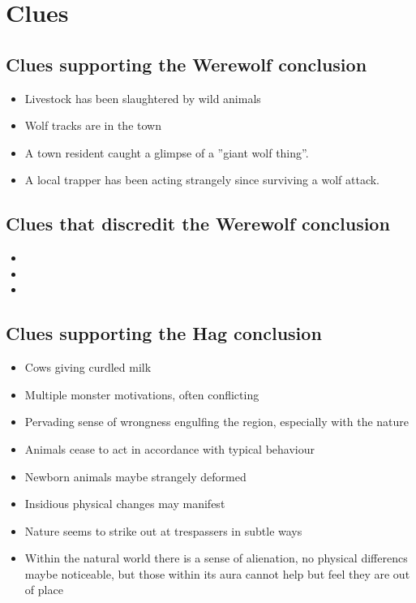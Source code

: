 \chapter{Clues}

\section{Clues supporting the Werewolf conclusion}

\begin{itemize}
    \item Livestock has been slaughtered by wild animals
    \item Wolf tracks are in the town
    \item A town resident caught a glimpse of a ''giant wolf thing''.
    \item A local trapper has been acting strangely since surviving a wolf attack.
\end{itemize}

\section{Clues that discredit the Werewolf conclusion}

\begin{itemize}
    \item 
    \item 
    \item 
\end{itemize}

\section{Clues supporting the Hag conclusion}

\begin{itemize}
    \item Cows giving curdled milk
    \item Multiple monster motivations, often conflicting
    \item Pervading sense of wrongness engulfing the region, especially with the nature
    \item Animals cease to act in accordance with typical behaviour
    \item Newborn animals maybe strangely deformed
    \item Insidious physical changes may manifest
    \item Nature seems to strike out at trespassers in subtle ways
    \item Within the natural world there is a sense of alienation, no physical differencs maybe noticeable, but those within its aura cannot help but feel they are out of place
\end{itemize}
